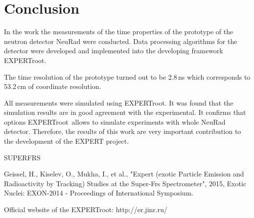 \documentclass{webofc}
\newcommand{\er}{\textmd{EXPERTroot}}
\begin{document}


\section{Conclusion}
In the work the measurements of the time properties of the prototype of the neutron detector NeuRad were conducted.
Data processing algorithms for the detector were developed and implemented into the developing framework \er.

The time resolution of the prototype turned out to be 2.8\,ns which corresponds to 53.2\,cm of coordinate resolution.

All measurements were simulated using \er. It was found that the simulation results are in good agreement with the experimental. It confirms that options \er\, allows to simulate experiments with whole NeuRad detector.
Therefore, the results of this work are very important contribution to the development of the EXPERT project.

\begin{thebibliography}{999}
	
	 SUPERFRS
	
	Geissel, H., Kiselev, O., Mukha, I., et al., "Expert (exotic Particle Emission and Radioactivity by Tracking) Studies at the Super-Frs Spectrometer", 2015, Exotic Nuclei: EXON-2014 - Proceedings of International Symposium.
	
	Official website of the EXPERTroot: 
	http://er.jinr.ru/
	
\end{thebibliography}
\end{document}
